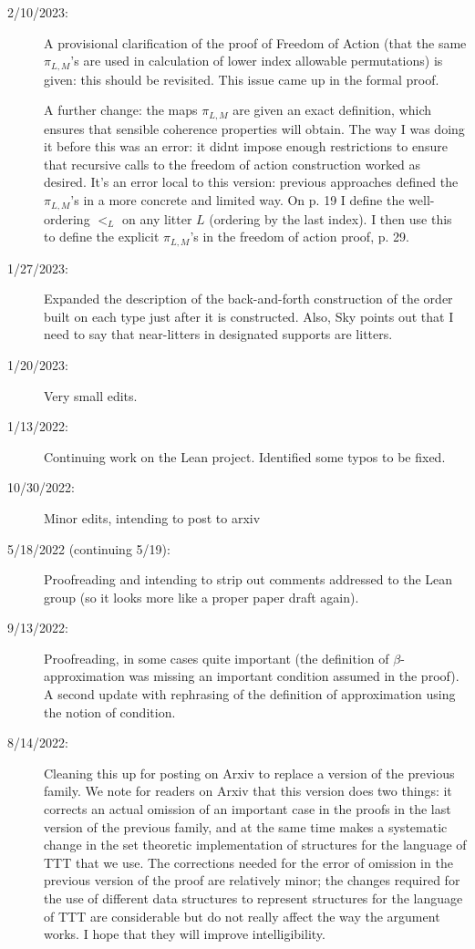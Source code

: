 \documentclass[112pt]{article}
\begin{document}
\begin{description}

\item[2/10/2023:]  A provisional clarification of the proof of Freedom of Action (that the same $\pi_{L,M}$'s are used in calculation of lower index allowable permutations) is given:  this should be revisited.  This issue came up in the formal proof.

A further change:  the maps $\pi_{L,M}$ are given an exact definition, which ensures that sensible coherence properties will obtain.  The way I was doing it before this was an error:  it didnt impose enough restrictions to ensure that recursive calls to the freedom of action construction worked as desired.  It's an error local to this version:  previous approaches defined the $\pi_{L,M}$'s in a more concrete and limited way.  On p. 19 I define the well-ordering $<_L$ on any litter $L$ (ordering by the last index).  I then use this to define the explicit $\pi_{L,M}$'s in the freedom of action proof, p. 29.

\item[1/27/2023:]  Expanded the description of the back-and-forth construction of the order built on each type just after it is constructed.  Also, Sky points out that I need to say that near-litters in designated supports are litters.

\item[1/20/2023:]  Very small edits.

\item[1/13/2022:]  Continuing work on the Lean project.  Identified some typos to be fixed.

\item[10/30/2022:]  Minor edits, intending to post to arxiv

\item[5/18/2022 (continuing 5/19):]  Proofreading and intending to strip out comments addressed to the Lean group (so it looks more like a proper paper draft again).

\item[9/13/2022:]  Proofreading, in some cases quite important (the definition of $\beta$-approximation was missing an important condition assumed in the proof).   A second update with rephrasing of the definition of approximation using the notion of condition.

\item[8/14/2022:]  Cleaning this up for posting on Arxiv to replace a version of the previous family.  We note for readers on Arxiv that this version does two things:  it corrects an actual omission of an important case in the proofs in the last version of the previous family, and at the same time makes a systematic change in the set theoretic implementation
of structures for the language of TTT that we use.  The corrections needed for the error of omission in the previous version of the proof are relatively minor;  the changes required for the use of different data structures to represent structures for the language of TTT are considerable but do not really affect the way the argument works.  I hope that they will improve intelligibility.


\end{description}
\end{document}
